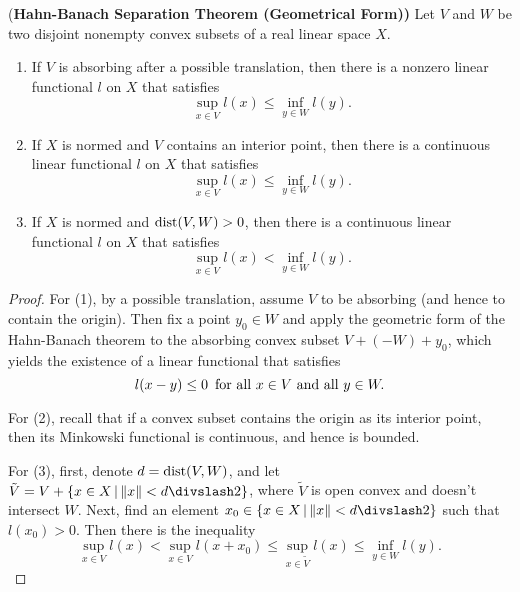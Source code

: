 \begin{theorem}{(\bf Hahn-Banach Separation Theorem (Geometrical Form))}
  Let $V$ and $W$ be two disjoint nonempty convex subsets of a real linear space $X$.
  \begin{enumerate}
    \item If $V$ is absorbing after a possible translation, then there is a nonzero linear functional $l$ on $X$ that satisfies
    \begin{equation*}
        \sup_{x\in V}l(x)\leq\inf_{y\in W}l(y).
      \end{equation*}
    \item If $X$ is normed and $V$ contains an interior point, then there is a continuous linear functional $l$ on $X$ that satisfies
    \begin{equation*}
      \sup_{x\in V}l(x)\leq\inf_{y\in W}l(y).
    \end{equation*}
    \item If $X$ is normed and $\operatorname{dist}(V, W)>0$, then there is a continuous linear functional $l$ on $X$ that satisfies
    \begin{equation*}
      \sup_{x\in V}l(x)<\inf_{y\in W}l(y).
    \end{equation*}
  \end{enumerate}
\end{theorem}

\begin{proof}
  For (1), by a possible translation, assume $V$ to be absorbing (and hence to contain the origin). Then fix a point $y_0\in W$ and apply the geometric form of the Hahn-Banach theorem to the absorbing convex subset $V+(-W)+y_0$, which yields the existence of a linear functional that satisfies
  \begin{equation*}
    l(x-y)\leq 0\text{\enskip for all }x\in V\text{ and all }y\in W.
  \end{equation*}

  For (2), recall that if a convex subset contains the origin as its interior point, then its Minkowski functional is continuous, and hence is bounded.

  For (3), first, denote $d=\operatorname{dist}(V, W)$, and let $\tilde V = V + \{x\in X\VERT \NORM x< d\DIV 2\}$, where $\tilde V$ is open convex and doesn't intersect $W$. Next, find an element $x_0\in \{x\in X\VERT \NORM x< d\DIV 2\}$ such that $l(x_0)>0$. Then there is the inequality
  \begin{equation*}
    \sup_{x\in V}l(x)<\sup_{x\in V}l(x+x_0)\leq\sup_{x\in\tilde V}l(x)\leq \inf_{y\in W}l(y).
  \end{equation*}
\end{proof}


